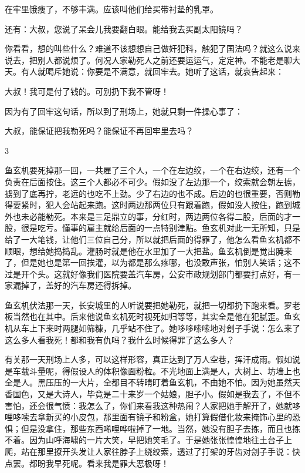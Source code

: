 在牢里饿瘦了，不够丰满。应该叫他们给买带衬垫的乳罩。 

还有：大叔，您说了呆会儿我要翻白眼。能给我去买副太阳镜吗？ 

你看看，想的叫些什么？难道不该想想自己做奸犯科，触犯了国法吗？就这么说来说去，把别人都说烦了。何况人家勒死人之前还要运运气，定定神。不能老是聊大天。有人就喝斥她说：你要是不满意，就回牢去。她听了这话，就哀告起来： 

大叔！我可是付了钱的。可别扔下我不管呀！ 

因为有了回牢这句话，所以到了刑场上，她就只剩一件操心事了： 

大叔，能保证把我勒死吗？能保证不再回牢里去吗？ 

3 

鱼玄机要死掉那一回，一共雇了三个人，一个在左边绞，一个在右边绞，还有一个负责在后面按住。这三个人都必不可少。假如没了左边那一个，绞索就会朝左掳，掳到了底再拧，老远的也吃不上劲。少了右边的也不成。后边的也很重要，否则勒得要紧时，犯人会站起来跑。这时两边那两位只有跟着跑，假如没人按住，跑到城外也未必能勒死。本来是三足鼎立的事，分红时，两边两位各得二股，后面的才一股，很是吃亏。懂事的雇主就给后面的一点特别津贴。鱼玄机对此一无所知，只是给了一大笔钱，让他们三位自己分，所以就把后面的得罪了，他怎么看鱼玄机都不顺眼，想给她捣捣乱。灌肠时就是他在水里加了一大把盐。鱼玄机倒是觉出腌来了，但是她也是第一回挨灌，以为都是那么疼哪，也没敢声张，怕别人笑话；这不过是开个头。这就好像我们医院要盖汽车房，公安市政规划部门都要打点好，有一家漏掉了，盖好的汽车房还得拆掉。 

鱼玄机伏法那一天，长安城里的人听说要把她勒死，就把一切都扔下跑来看。罗老板当然也在其中。后来他说鱼玄机死时视死如归等等，其实全是他在犯腻歪。鱼玄机从车上下来时两腿如筛糠，几乎站不住了。她哆哆嗦嗦地对刽子手说：怎么来了这么多人看我死！都和我有仇吗？我什么时候得罪了这么多人？ 

有关那一天刑场上人多，可以这样形容，真正达到了万人空巷，挥汗成雨。假如说是车载斗量呢，得假设人的体积像面粉粒。不光地面上满是人，大树上、坊墙上也全是人。黑压压的一大片，全都目不转睛盯着鱼玄机，不由她不怕。因为她虽然天香国色，又是大诗人，毕竟是二十来岁一个姑娘，胆子小。假如是我去了，不但不害怕，还会很气愤：我怎么了，你们来看我这种热闹？人家把她手解开了，她就哆哩哆嗦去拿新买的小皮包，那里面有镜子和粉盒，她打算假借化妆来掩饰心里的恐惧；但是没拿住，那些东西唏哩哗啦掉了一地。当然，她没有胆子去拣，而且也拣不着。因为山呼海啸的一片大笑，早把她笑毛了。于是她张张惶惶地往土台子上爬，站在那里撩开头发让人家往脖子上绕绞索，透过了打架的牙齿对刽子手说：快点罢。都盼我早死呢。看来我是罪大恶极呀！ 

